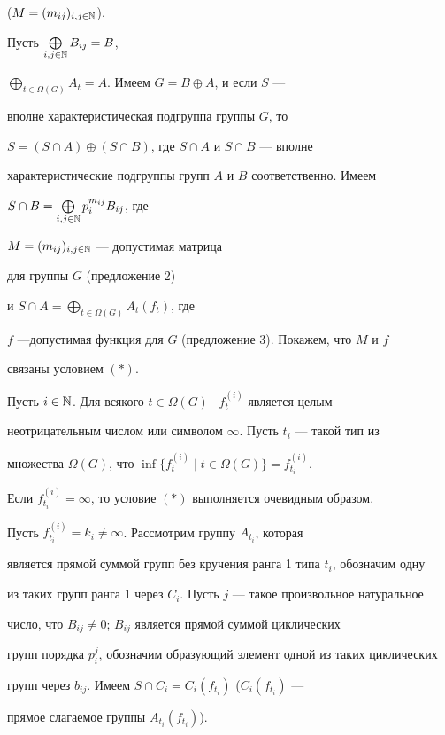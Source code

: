 \begin{pf}
($M=(m_{ij})_{i,j\in\Bbb N}$).





Пусть $\bigoplus\limits_{i,j\in\Bbb N}B_{ij}=B$,


$\bigoplus\limits_{t\in\Omega(G)}A_t=A$. Имеем $G=B\oplus A$, и если $S$ ---


вполне характеристическая подгруппа группы $G$, то


$S=(S\cap A)\oplus(S\cap B)$, где $S\cap A$ и $S\cap B$ --- вполне


характеристические подгруппы групп $A$ и $B$ соответственно. Имеем


$S\cap B=\bigoplus\limits_{i,j\in\Bbb N}p_i^{m_{ij}}B_{ij}$, где


$M=(m_{ij})_{i,j\in\Bbb N}$ --- допустимая матрица


для группы $G$ (предложение 2)


и $S\cap A=\bigoplus\limits_{t\in\Omega(G)}A_t(f_t)$, где


$f$ ---допустимая функция для $G$ (предложение 3). Покажем, что $M$ и $f$


связаны условием $(\ast)$.





Пусть $i\in\Bbb N$. Для всякого $t\in\Omega(G)$ \ $f_t^{(i)}$ является целым


неотрицательным числом или символом $\infty$. Пусть $t_i$ --- такой тип из


множества $\Omega(G)$, что $\inf\{f_t^{(i)}\mid t\in\Omega(G)\}=f_{t_i}^{(i)}$.


Если $f_{t_i}^{(i)}=\infty$, то условие $(\ast)$ выполняется очевидным образом.


Пусть $f_{t_i}^{(i)}=k_i\ne\infty$. Рассмотрим группу $A_{t_i}$, которая


является прямой суммой групп без кручения ранга 1 типа $t_i$, обозначим одну


из таких групп ранга 1 через $C_i$. Пусть $j$ --- такое произвольное натуральное


число, что $B_{ij}\ne 0$; $B_{ij}$ является прямой суммой циклических


групп порядка $p_i^j$, обозначим образующий элемент одной из таких циклических


групп через $b_{ij}$. Имеем $S\cap C_i=C_i(f_{t_i})$ ($C_i(f_{t_i})$ ---


прямое слагаемое группы $A_{t_i}(f_{t_i})$).






\end{pf}
